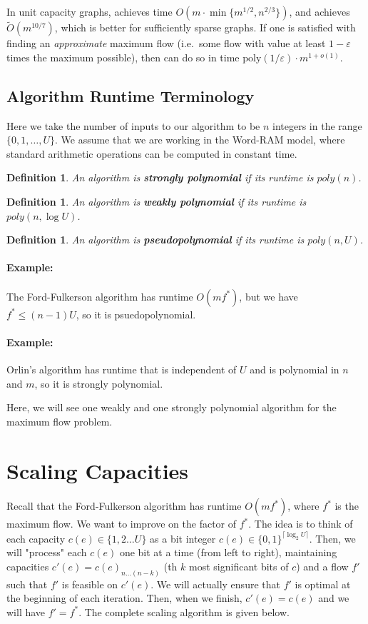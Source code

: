 \documentclass[11pt]{article}
\newtheorem{definition}[theorem]{Definition}
\begin{document}
In unit capacity graphs, \cite{EvenT75} achieves time $O(m \cdot\min\{m^{1/2}, n^{2/3}\})$, and \cite{Madry13} achieves $\tilde{O}(m^{10/7})$, which is better for sufficiently sparse graphs.  If one is satisfied with finding an {\em approximate} maximum flow (i.e.\ some flow with value at least $1-\varepsilon$ times the maximum possible), then \cite{KLO+14,Sherman13} can do so in time $\mathrm{poly}(1/\varepsilon)\cdot m^{1+o(1)}$.

\subsection{Algorithm Runtime Terminology}
Here we take the number of inputs to our algorithm to be $n$ integers in the range $\{ 0, 1, \ldots, U \}$. We assume that we are working in the Word-RAM model, where standard arithmetic operations can be computed in constant time. 

\begin{definition}
An algorithm is \textbf{strongly polynomial} if its runtime is $poly(n)$. 
\end{definition}

\begin{definition}
An algorithm is \textbf{weakly polynomial} if its runtime is $poly(n, \log U)$. 
\end{definition}

\begin{definition}
An algorithm is \textbf{pseudopolynomial} if its runtime is $poly(n, U)$. 
\end{definition}

\paragraph{Example:} The Ford-Fulkerson algorithm has runtime $O(m f^*)$, but we have $f^* \leq (n - 1)U $, so it is psuedopolynomial. 

\paragraph{Example:} Orlin's algorithm has runtime that is independent of $U$ and is polynomial in $n$ and $m$, so it is strongly polynomial. 

Here, we will see one weakly and one strongly polynomial algorithm for the maximum flow problem. 

\section{Scaling Capacities}
Recall that the Ford-Fulkerson algorithm has runtime $O(mf^*)$, where $f^*$ is the maximum flow. We want to improve on the factor of $f^*$. The idea is to think of each capacity $c (e)\in \{1, 2 \ldots U\}$  as a bit integer $c(e) \in \{0, 1\}^{\lceil \log_2 U \rceil}$. Then, we will "process" each $c(e)$ one bit at a time (from left to right), maintaining capacities $c'(e) = c(e)_{n \ldots (n-k)}$ (th $k$ most significant bits of $c$) and a flow $f'$ such that $f'$ is feasible on $c'(e)$. We will actually ensure that $f'$ is optimal at the beginning of each iteration. Then, when we finish, $c'(e) = c(e)$ and we will have $f' = f^*$. The complete scaling algorithm is given below. 
\end{document}
